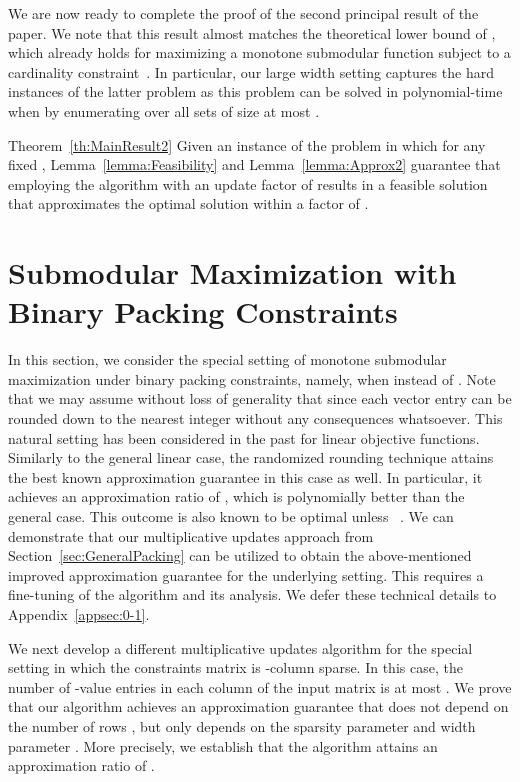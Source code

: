 \documentclass[11pt]{article}
\theoremstyle{plain}
\theoremstyle{definition}
\begin{document}
We are now ready to complete the proof of the second principal
result of the paper. We note that this result almost matches the
theoretical lower bound of , which already holds for
maximizing a monotone submodular function subject to a cardinality
constraint~\cite{NemhauserWF78,Feige98}. In particular, our large
width setting captures the hard instances of the latter problem as
this problem can be solved in polynomial-time when  by enumerating over all sets of size at most .

\begin{proofof}{Theorem~\ref{th:MainResult2}}
Given an instance of the problem in which  for any fixed ,
Lemma~\ref{lemma:Feasibility} and Lemma~\ref{lemma:Approx2}
guarantee that employing the algorithm with an update factor of
 results in a feasible solution that
approximates the optimal solution within a factor of .~
\end{proofof}


\section{Submodular Maximization with Binary Packing Constraints} \label{subsec:0-1Packing}
In this section, we consider the special setting of monotone
submodular maximization under binary packing constraints, namely,
when  instead of . Note that we may assume without loss of generality
that  since each vector entry can be rounded down
to the nearest integer without any consequences whatsoever. This
natural setting has been considered in the past for linear
objective functions. Similarly to the general linear case, the
randomized rounding technique attains the best known approximation
guarantee in this case as well. In particular, it achieves an
approximation ratio of , which is
polynomially better than the general case. This outcome is also
known to be optimal unless ~\cite{ChekuriK04}. We can demonstrate that our
multiplicative updates approach from
Section~\ref{sec:GeneralPacking} can be utilized to obtain the
above-mentioned improved approximation guarantee for the
underlying setting. This requires a fine-tuning of the algorithm
and its analysis. We defer these technical details to
Appendix~\ref{appsec:0-1}.

We next develop a different multiplicative updates algorithm for
the special setting in which the constraints matrix is -column
sparse. In this case, the number of -value entries in each
column of the input matrix is at most . We prove that our
algorithm achieves an approximation guarantee that does not depend
on the number of rows , but only depends on the sparsity
parameter  and width parameter . More precisely, we
establish that the algorithm attains an approximation ratio of
.
\end{document}
